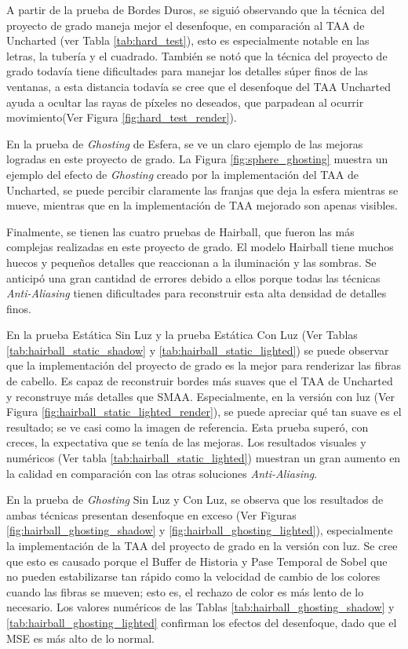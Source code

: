 \documentclass[pregrado]{tesis-usb} %
\begin{document}
A partir de la prueba de Bordes Duros, se siguió observando que la técnica del proyecto de grado maneja mejor el desenfoque, en comparación al TAA de Uncharted (ver Tabla \ref{tab:hard_test}), esto es especialmente notable en las letras, la tubería y el cuadrado. También se notó que la técnica del proyecto de grado todavía tiene dificultades para manejar los detalles súper finos de las ventanas, a esta distancia todavía se cree que el desenfoque del TAA Uncharted ayuda a ocultar las rayas de píxeles no deseados, que parpadean al ocurrir movimiento(Ver Figura \ref{fig:hard_test_render}).

En la prueba de \textit{Ghosting} de Esfera, se ve un claro ejemplo de las mejoras logradas en este proyecto de grado. La Figura \ref{fig:sphere_ghosting} muestra un ejemplo del efecto de \textit{Ghosting} creado por la implementación del TAA de Uncharted, se puede percibir claramente las franjas que deja la esfera mientras se mueve, mientras que en la implementación de TAA mejorado son apenas visibles.

Finalmente, se tienen las cuatro pruebas de Hairball, que fueron las más complejas realizadas en este proyecto de grado. El modelo Hairball tiene muchos huecos y pequeños detalles que reaccionan a la iluminación y las sombras. Se anticipó una gran cantidad de errores debido a ellos porque todas las técnicas \textit{Anti-Aliasing} tienen dificultades para reconstruir esta alta densidad de detalles finos.

En la prueba Estática Sin Luz y la prueba Estática Con Luz (Ver Tablas \ref{tab:hairball_static_shadow} y \ref{tab:hairball_static_lighted}) se puede observar que la implementación del proyecto de grado es la mejor para renderizar las fibras de cabello. Es capaz de reconstruir bordes más suaves que el TAA de Uncharted y reconstruye más detalles que SMAA. Especialmente, en la versión con luz (Ver Figura \ref{fig:hairball_static_lighted_render}), se puede apreciar qué tan suave es el resultado; se ve casi como la imagen de referencia. Esta prueba superó, con creces, la expectativa que se tenía de las mejoras. Los resultados visuales y numéricos (Ver tabla \ref{tab:hairball_static_lighted}) muestran un gran aumento en la calidad en comparación con las otras soluciones \textit{Anti-Aliasing}.

En la prueba de \textit{Ghosting} Sin Luz y Con Luz, se observa que los resultados de ambas técnicas presentan desenfoque en exceso (Ver Figuras \ref{fig:hairball_ghosting_shadow} y \ref{fig:hairball_ghosting_lighted}), especialmente la implementación de la TAA del proyecto de grado en la versión con luz. Se cree que esto es causado porque el Buffer de Historia y Pase Temporal de Sobel que no pueden estabilizarse tan rápido como la velocidad de cambio de los colores cuando las fibras se mueven; esto es, el rechazo de color es más lento de lo necesario. Los valores numéricos de las Tablas \ref{tab:hairball_ghosting_shadow} y \ref{tab:hairball_ghosting_lighted} confirman los efectos del desenfoque, dado que el MSE es más alto de lo normal.
\end{document}
